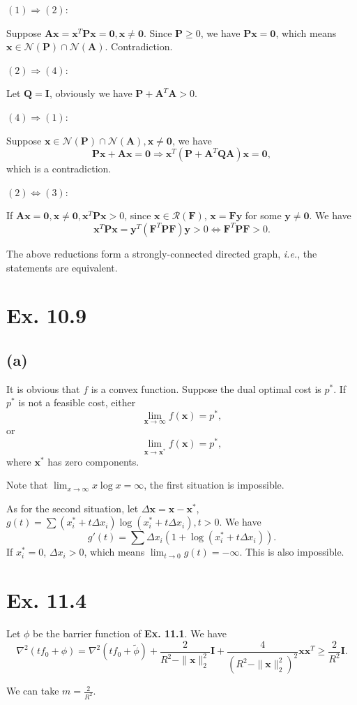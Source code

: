 \documentclass[12pt]{article}
\begin{document}
$(1)\Rightarrow(2)$:

Suppose $\bm{Ax}=\bm{x}^T\bm{Px}=\bm{0},\bm{x}\neq\bm{0}$. Since $\bm{P}\ge 0$, we have $\bm{Px}=\bm{0}$, which means $\bm{x}\in\mathcal{N}(\bm{P})\cap\mathcal{N}(\bm{A})$. Contradiction.

$(2)\Rightarrow(4)$:

Let $\bm{Q}=\bm{I}$, obviously we have $\bm{P}+\bm{A}^T\bm{A}>0$.

$(4)\Rightarrow(1)$:

Suppose $\bm{x}\in\mathcal{N}(\bm{P})\cap\mathcal{N}(\bm{A}),\bm{x}\neq\bm{0}$, we have $$\bm{Px}+\bm{Ax}=\bm{0}\Rightarrow \bm{x}^T(\bm{P}+\bm{A}^T\bm{QA})\bm{x}=\bm{0},$$ which is a contradiction.

$(2)\Leftrightarrow(3)$:

If $\bm{Ax}=\bm{0},\bm{x}\neq\bm{0},\bm{x}^T\bm{Px}>0$, since $\bm{x}\in\mathcal{R}(\bm{F})$, $\bm{x}=\bm{Fy}$ for some $\bm{y}\neq\bm{0}$. We have $$\bm{x}^T\bm{Px}=\bm{y}^T(\bm{F}^T\bm{PF})\bm{y}>0\Leftrightarrow\bm{F}^T\bm{PF}>0.$$

The above reductions form a strongly-connected directed graph, \textit{i.e.}, the statements are equivalent.

\section*{Ex. 10.9}
\subsection*{(a)}
It is obvious that $f$ is a convex function. Suppose the dual optimal cost is $p^*$. If $p^*$ is not a feasible cost, either $$\lim_{\bm{x}\rightarrow\infty}f(\bm{x})=p^*,$$ or $$\lim_{\bm{x}\rightarrow\bm{x}^*}f(\bm{x})=p^*,$$ where $\bm{x}^*$ has zero components.

Note that $\lim_{x\rightarrow\infty}x\log x=\infty$, the first situation is impossible.

As for the second situation, let $\Delta\bm{x}=\bm{x}-\bm{x}^*$, $g(t)=\sum (x_i^*+t\Delta x_i)\log(x_i^*+t\Delta x_i), t>0.$ We have $$g'(t)=\sum\Delta x_i(1+\log(x_i^*+t\Delta x_i)).$$ If $x_i^*=0$, $\Delta x_i>0$, which means $\lim_{t\rightarrow 0}g(t)=-\infty$. This is also impossible.

\section*{Ex. 11.4}
Let $\phi$ be the barrier function of \textbf{Ex. 11.1}. We have $$\nabla^2(tf_0+\phi)=\nabla^2(tf_0+\tilde{\phi})+\dfrac{2}{R^2-\|\bm{x}\|_2^2}\bm{I}+\dfrac{4}{(R^2-\|\bm{x}\|_2^2)^2}\bm{x}\bm{x}^T\ge\dfrac{2}{R^2}\bm{I}.$$

We can take $m=\frac{2}{R^2}.$
\end{document}
